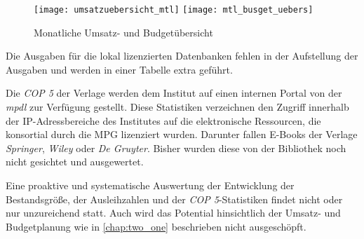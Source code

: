 \begin{figure}[h]
    \centering
        \texttt{[image: umsatzuebersicht\_mtl]}
        \texttt{[image: mtl\_busget\_uebers]}
        \caption{Monatliche Umsatz- und Budgetübersicht}
        \label{fig:budget- und umsatzuebersicht}
\end{figure}

Die Ausgaben für die lokal lizenzierten Datenbanken fehlen in der Aufstellung der Ausgaben und werden in einer Tabelle extra geführt.

Die \textit{\acrfull{COP 5}} der Verlage werden dem Institut auf einen internen Portal von der \textit{\acrshort{mpdl}} zur Verfügung gestellt.
Diese Statistiken verzeichnen den Zugriff innerhalb der IP-Adressbereiche des Institutes auf die elektronische Ressourcen, 
die konsortial durch die \acrshort{MPG} lizenziert wurden. Darunter fallen E-Books der Verlage 
\textit{Springer}, \textit{Wiley} oder \textit{De Gruyter}. Bisher wurden diese von der Bibliothek noch nicht gesichtet und ausgewertet.

Eine proaktive und systematische Auswertung der Entwicklung der Bestandsgröße, der Ausleihzahlen und der \textit{\acrshort{COP 5}}-Statistiken findet nicht
oder nur unzureichend statt. Auch wird das Potential hinsichtlich der Umsatz- und Budgetplanung wie in \autoref{chap:two_one} beschrieben
nicht ausgeschöpft.


